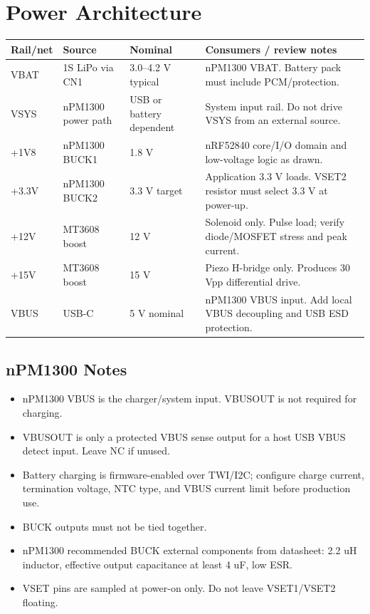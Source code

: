 \documentclass[11pt,a4paper]{article}
\begin{document}
\section{Power Architecture}

\begin{table}[h]
\small
\begin{tabularx}{\textwidth}{lllL}
\toprule
\textbf{Rail/net} & \textbf{Source} & \textbf{Nominal} & \textbf{Consumers / review notes}\\
\midrule
VBAT & 1S LiPo via CN1 & 3.0--4.2 V typical & nPM1300 VBAT. Battery pack must include PCM/protection.\\
VSYS & nPM1300 power path & USB or battery dependent & System input rail. Do not drive VSYS from an external source.\\
+1V8 & nPM1300 BUCK1 & 1.8 V & nRF52840 core/I/O domain and low-voltage logic as drawn.\\
+3.3V & nPM1300 BUCK2 & 3.3 V target & Application 3.3 V loads. VSET2 resistor must select 3.3 V at power-up.\\
+12V & MT3608 boost & 12 V & Solenoid only. Pulse load; verify diode/MOSFET stress and peak current.\\
+15V & MT3608 boost & 15 V & Piezo H-bridge only. Produces 30 Vpp differential drive.\\
VBUS & USB-C & 5 V nominal & nPM1300 VBUS input. Add local VBUS decoupling and USB ESD protection.\\
\bottomrule
\end{tabularx}
\end{table}

\subsection{nPM1300 Notes}

\begin{itemize}
  \item nPM1300 VBUS is the charger/system input. VBUSOUT is not required for charging.
  \item VBUSOUT is only a protected VBUS sense output for a host USB VBUS detect input. Leave NC if unused.
  \item Battery charging is firmware-enabled over TWI/I2C; configure charge current, termination voltage, NTC type, and VBUS current limit before production use.
  \item BUCK outputs must not be tied together.
  \item nPM1300 recommended BUCK external components from datasheet: 2.2 uH inductor, effective output capacitance at least 4 uF, low ESR.
  \item VSET pins are sampled at power-on only. Do not leave VSET1/VSET2 floating.
\end{itemize}
\end{document}
